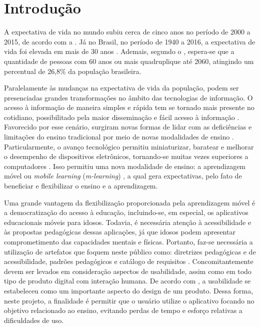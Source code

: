 \chapter{Introdução}
\label{sec:introd}
A expectativa de vida no mundo subiu cerca de cinco anos no período de 2000 a 2015, de acordo com a \cite{world2016world}. Já no Brasil, no período de 1940 a 2016, a expectativa de vida foi elevada em mais de 30 anos \citep{expectativabrasileiros}. Ademais, segundo o \cite{demografico2010disponivel}, espera-se que a quantidade de pessoas com 60 anos ou mais quadruplique até 2060, atingindo um percentual de 26,8\% da população brasileira. 

Paralelamente às mudanças na expectativa de vida da população, podem ser presenciadas grandes transformações no âmbito das tecnologias de informação. O acesso à informação de maneira simples e rápida tem se tornado mais presente no cotidiano, possibilitado pela maior disseminação e fácil acesso à informação \citep{Grossi2014}. Favorecido por esse cenário, surgiram novas formas de lidar com as deficiências e limitações do ensino tradicional por meio de novas modalidades de ensino \citep{Behrens2005}. Particularmente, o avanço tecnológico permitiu miniaturizar, baratear e melhorar o desempenho de dispositivos eletrônicos, tornando-se muitas vezes superiores a computadores \citep{Zamfirache2013}. Isso permitiu uma nova modalidade de ensino: a aprendizagem móvel ou \textit{mobile learning} (\textit{m-learning}) \citep{Crompton2013, Keegan2005, Traxler2006, Wu2012}, a qual gera expectativas, pelo fato de beneficiar e flexibilizar o ensino e a aprendizagem.

Uma grande vantagem da flexibilização proporcionada pela aprendizagem móvel é a democratização do acesso à educação, incluindo-se, em especial, os aplicativos educacionais móveis para idosos. Todavia, é necessária atenção à acessibilidade e às propostas pedagógicas dessas aplicações, já que idosos podem apresentar comprometimento das capacidades mentais e físicas. Portanto, faz-se necessária a utilização de artefatos que foquem neste público como: diretrizes pedagógicas e de acessibilidade, padrões pedagógicos e catálogo de requisitos \citep{Oliveira2019_quali}. Concomitantemente devem ser levados em consideração aspectos de usabilidade, assim como em todo tipo de produto digital com interação humana. De acordo com \cite{zoemack_importance_usability2009}, a usabilidade se estabeleceu como um importante aspecto do design de um produto. Dessa forma, neste projeto, a finalidade é permitir que o usuário utilize o aplicativo focando no objetivo relacionado ao ensino, evitando perdas de tempo e esforço relativas a dificuldades de uso.

